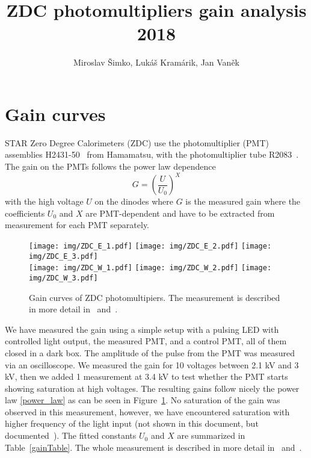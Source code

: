\documentclass[a4paper,10pt]{article}
\title{ZDC photomultipliers gain analysis 2018}
\author{Miroslav Šimko, Lukáš Kramárik, Jan Vaněk}
\date{}
\begin{document}
\maketitle

\section{Gain curves}
STAR Zero Degree Calorimeters (ZDC) use the photomultiplier (PMT) assemblies H2431-50~\cite{H2431} from Hamamatsu, with the photomultiplier tube R2083~\cite{R2083}. The gain on the PMTs follows the power law dependence
\begin{equation} \label{power_law}
G = \left(\frac{U}{U_0} \right)^X
\end{equation}
with the high voltage $U$ on the dinodes where $G$ is the measured gain where the coefficients $U_0$ and $X$ are PMT-dependent and have to be extracted from measurement for each PMT separately.

\begin{figure}[htb]
\begin{center}
\texttt{[image: img/ZDC\_E\_1.pdf]}
\texttt{[image: img/ZDC\_E\_2.pdf]}
\texttt{[image: img/ZDC\_E\_3.pdf]}\\
\texttt{[image: img/ZDC\_W\_1.pdf]}
\texttt{[image: img/ZDC\_W\_2.pdf]}
\texttt{[image: img/ZDC\_W\_3.pdf]}
\end{center}
\caption{\label{gainCurves}Gain curves of ZDC photomultipiers. The measurement is described in more detail in~\cite{table} and~\cite{ZDC_PMT_presentation}.}
\end{figure}

We have measured the gain using a simple setup with a pulsing LED with controlled light output, the measured PMT, and a control PMT, all of them closed in a dark box. The amplitude of the pulse from the PMT was measured via an oscilloscope. We measured the gain for 10 voltages between 2.1 kV and 3 kV, then we added 1 measurement at 3.4 kV to test whether the PMT starts showing saturation at high voltages\@. The resulting gains follow nicely the power law \eqref{power_law} as can be seen in Figure~\ref{gainCurves}. No saturation of the gain was observed in this measurement, however, we have encountered saturation with higher frequency of the light input (not shown in this document, but documented~\cite{table})\@. The fitted constants $U_0$ and $X$ are summarized in Table~\ref{gainTable}. The whole measurement is described in more detail in~\cite{table} and~\cite{ZDC_PMT_presentation}.
\end{document}
